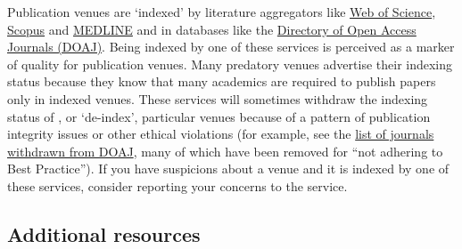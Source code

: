 \documentclass[letterpaper, 12pt]{article}
\begin{document}
Publication venues are `indexed' by literature aggregators like \href{https://www.webofscience.com/wos/}{Web of Science}, \href{https://www.scopus.com}{Scopus} and \href{https://www.nlm.nih.gov/medline/medline_home.html}{MEDLINE} and in databases like the \href{https://doaj.org/}{Directory of Open Access Journals (DOAJ)}. Being indexed by one of these services is perceived as a marker of quality for publication venues. Many predatory venues advertise their indexing status because they know that many academics are required to publish papers only in indexed venues. These services will sometimes withdraw the indexing status of , or `de-index', particular venues because of a pattern of publication integrity issues or other ethical violations (for example, see the \href{https://docs.google.com/spreadsheets/d/1Kv3MbgFSgtSDnEGkA2JacrSjunRu0umHeZCtcMeqO5E/edit?gid=2104690845\#gid=2104690845}{list of journals withdrawn from DOAJ}, many of which have been removed for ``not adhering to Best Practice''). If you have suspicions about a venue and it is indexed by one of these services, consider reporting your concerns to the service.

\subsection*{Additional resources}
\end{document}
